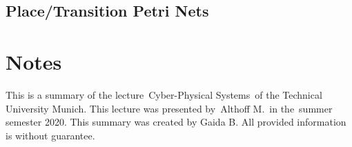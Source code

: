 \documentclass[10pt,a4paper]{article}
\newcommand{\lecture}{Cyber-Physical Systems} %
\newcommand{\lecturer}{Althoff M.} %
\newcommand{\semseter}{summer semester 2020} %
\begin{document}
\subsection{Place/Transition Petri Nets}









\pagebreak
\section*{Notes}
This is a summary of the lecture~\lecture~of the Technical University Munich.
This lecture was presented by~\lecturer~in the~\semseter.
This summary was created by Gaida B.
All provided information is without guarantee.


\end{document}
